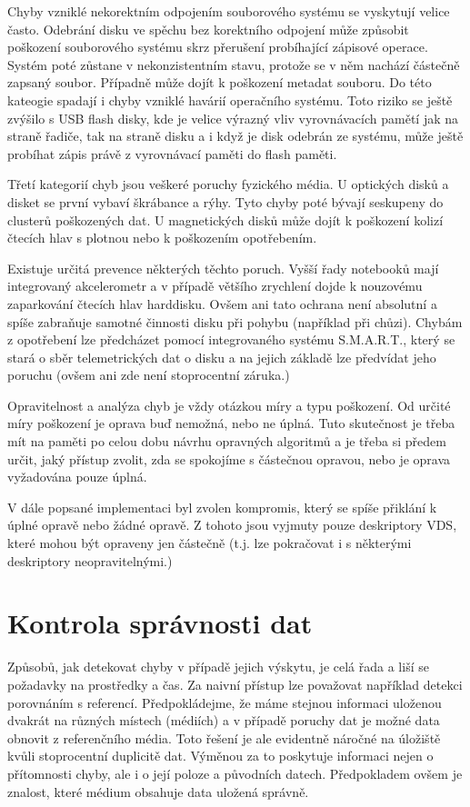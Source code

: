 Chyby vzniklé nekorektním odpojením souborového systému se vyskytují velice často. Odebrání disku ve spěchu bez korektního odpojení může způsobit poškození souborového systému skrz přerušení probíhající zápisové operace. Systém poté zůstane v nekonzistentním stavu, protože se v něm nachází částečně zapsaný soubor. Případně může dojít k poškození metadat souboru. Do této kateogie spadají i chyby vzniklé havárií operačního systému. Toto riziko se ještě zvýšilo s USB flash disky, kde je velice výrazný vliv vyrovnávacích pamětí jak na straně řadiče, tak na straně disku a i když je disk odebrán ze systému, může ještě probíhat zápis právě z vyrovnávací paměti do flash paměti.

Třetí kategorií chyb jsou veškeré poruchy fyzického média. U optických disků a disket se první vybaví škrábance a rýhy. Tyto chyby poté bývají seskupeny do clusterů poškozených dat. U magnetických disků může dojít k poškození kolizí čtecích hlav s plotnou nebo k poškozením opotřebením.

Existuje určitá prevence některých těchto poruch. Vyšší řady notebooků mají integrovaný akcelerometr a v případě většího zrychlení dojde k nouzovému zaparkování čtecích hlav harddisku. Ovšem ani tato ochrana není absolutní a spíše zabraňuje samotné činnosti disku při pohybu (například při chůzi). Chybám z opotřebení lze předcházet pomocí integrovaného systému S.M.A.R.T., který se stará o sběr telemetrických dat o disku a na jejich základě lze předvídat jeho poruchu (ovšem ani zde není stoprocentní záruka.)

Opravitelnost a analýza chyb je vždy otázkou míry a typu poškození. Od určité míry poškození je oprava buď nemožná, nebo ne úplná. Tuto skutečnost je třeba mít na paměti po celou dobu návrhu opravných algoritmů a je třeba si předem určit, jaký přístup zvolit, zda se spokojíme s částečnou opravou, nebo je oprava vyžadována pouze úplná.

V dále popsané implementaci byl zvolen kompromis, který se spíše přiklání k úplné opravě nebo žádné opravě. Z tohoto jsou vyjmuty pouze deskriptory VDS, které mohou být opraveny jen částečně (t.j. lze pokračovat i s některými deskriptory neopravitelnými.)

\section{Kontrola správnosti dat}
\label{sec:errordetection}
Způsobů, jak detekovat chyby v případě jejich výskytu, je celá řada a liší se požadavky na prostředky a čas. Za naivní přístup lze považovat například detekci porovnáním s referencí. Předpokládejme, že máme stejnou informaci uloženou dvakrát na různých místech (médiích) a v případě poruchy dat je možné data obnovit z referenčního média. Toto řešení je ale evidentně náročné na úložiště kvůli stoprocentní duplicitě dat. Výměnou za to poskytuje informaci nejen o přítomnosti chyby, ale i o její poloze a původních datech. Předpokladem ovšem je znalost, které médium obsahuje data uložená správně.
 
